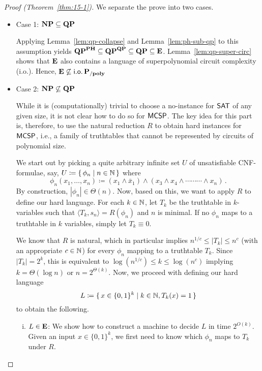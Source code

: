 \documentclass[11pt]{article}
\begin{document}
\begin{proof}[Proof (Theorem~\ref{thm:15-1})]
  We separate the prove into two cases.
	\begin{itemize}
		\item Case 1: $\mathbf{NP} \subseteq \mathbf{QP}$

      Applying Lemma~\ref{lem:qp-collapse} and Lemma~\ref{lem:ph-sub-qp} to
      this assumption yields
      $\mathbf{QP}^{\mathbf{PH}} \subseteq \mathbf{QP}^{\mathbf{QP}} \subseteq
       \mathbf{QP} \subseteq \mathbf{E}$.
      Lemma~\ref{lem:qp-super-circ} shows that $\mathbf{E}$ also contains
      a language of superpolynomial circuit complexity (i.o.).
      Hence, $\mathbf{E} \not\subseteq \mathsf{i.o.}\,\mathbf{P_{/poly}}$\\
		
		\item Case 2: $\mathbf{NP} \not\subseteq \mathbf{QP}$

      While it is (computationally) trivial to choose a no-instance for $\mathsf{SAT}$
      of any given size, it is not clear how to do so for $\mathsf{MCSP}$.
      The key idea for this part is, therefore, to use the natural reduction $R$
      to obtain hard instances for $\mathsf{MCSP}$, i.e., a family of
      truthtables that cannot be represented by circuits of polynomial size.

      We start out by picking a quite arbitrary infinite set $U$ of 
      unsatisfiable CNF-formulae, say,
      $U \coloneqq \{\, { \phi_n \mid n \in {\mathbb{N}} } \,\}$
      where
      \[
        \phi_n(x_1, \dots, x_n) \coloneqq
        (x_1 \land \bar x_1) \land
        (x_3 \land x_4 \land \cdots \cdots \cdots \land x_n) \,.
      \]
      By construction, $|\phi_n| \in \Theta(n)$.
      Now, based on this, we want to apply $R$ to define our hard language.
      For each $k \in {\mathbb{N}}$, let $T_k$ be the truthtable in $k$-variables such
      that $\langle T_k, s_n \rangle = R(\phi_n)$ and $n$ is minimal.
      If no $\phi_n$ maps to a truthtable in $k$ variables, simply let
      $T_k \equiv 0$.

      We know that $R$ is natural, which in particular implies
      $n^{1/c} \le |T_k| \le n^c$ (with an appropriate $c \in {\mathbb{N}}$)
      for every $\phi_n$ mapping to a truthtable $T_k$.
      Since $|T_k| = 2^k$, this is equivalent to
      $\log (n^{1/c}) \le k \le \log (n^c)$
      implying $k = \Theta(\log n)$ or $n = 2^{\Theta(k)}$.
      Now, we proceed with defining our hard language
      \[
        L \coloneqq
        \{\, {
          x \in \{0,1\}^k \mid
          k \in {\mathbb{N}},
          T_k(x) = 1
        } \,\}
      \]
      to obtain the following.
      \begin{enumerate}[(i)]
        \item $L \in \mathbf{E}$:
          We show how to construct a machine to decide $L$ in time
          $2^{O(k)}$.
          Given an input $x \in \{0,1\}^k$, we first need to know which
          $\phi_n$ maps to $T_k$ under $R$.


\end{enumerate}
\end{itemize}
\end{proof}
\end{document}

